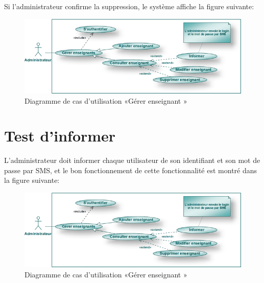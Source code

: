 \documentclass[12 pt ]{report}
\begin{document}
Si l'administrateur confirme la suppression, le système affiche la figure suivante:
\begin{figure}[h]
 \begin{center}
 \includegraphics[width= 13 cm ,height= 6 cm]{admin2.png}
\caption{ Diagramme de cas d'utilisation  «Gérer enseignant »}
 \end{center}
\end{figure}
\section{Test d'informer }
L'administrateur doit informer chaque utilisateur de son identifiant et son mot de passe par SMS, et le bon fonctionnement de cette fonctionnalité est montré dans la figure suivante:
\begin{figure}[h]
 \begin{center}
 \includegraphics[width= 13 cm ,height= 6 cm]{admin2.png}
\caption{ Diagramme de cas d'utilisation  «Gérer enseignant »}
 \end{center}
\end{figure}
\end{document}
